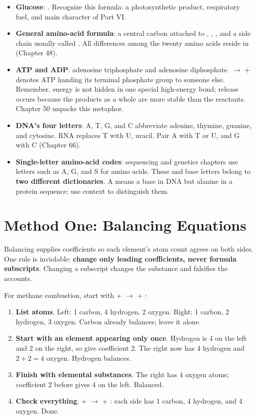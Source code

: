 \begin{itemize}[itemsep=2pt]
\item \textbf{Glucose}: . Recognize this formula: a photosynthetic product, respiratory fuel, and main character of Part VI.
\item \textbf{General amino-acid formula}: a central carbon attached to , , , and a side chain usually called . All differences among the twenty amino acids reside in  (Chapter 48).
\item \textbf{ATP and ADP}: adenosine triphosphate and adenosine diphosphate.  $\rightarrow$  +  denotes ATP handing its terminal phosphate group to someone else. Remember, energy is not hidden in one special high-energy bond; release occurs because the products as a whole are more stable than the reactants. Chapter 50 unpacks this metaphor.
\item \textbf{DNA's four letters}: A, T, G, and C abbreviate adenine, thymine, guanine, and cytosine. RNA replaces T with U, uracil. Pair A with T or U, and G with C (Chapter 66).
\item \textbf{Single-letter amino-acid codes}: sequencing and genetics chapters use letters such as A, G, and S for amino acids. These and base letters belong to \textbf{two different dictionaries}. A means a base in DNA but alanine in a protein sequence; use context to distinguish them.
\end{itemize}

\section{Method One: Balancing Equations}

Balancing supplies coefficients so each element's atom count agrees on both sides. One rule is inviolable: \textbf{change only leading coefficients, never formula subscripts}. Changing a subscript changes the substance and falsifies the accounts.

For methane combustion, start with  +  $\rightarrow$  + :

\begin{enumerate}[itemsep=2pt]
\item \textbf{List atoms}. Left: 1 carbon, 4 hydrogen, 2 oxygen. Right: 1 carbon, 2 hydrogen, 3 oxygen. Carbon already balances; leave it alone.
\item \textbf{Start with an element appearing only once}. Hydrogen is 4 on the left and 2 on the right, so give  coefficient 2. The right now has 4 hydrogen and $2+2=4$ oxygen. Hydrogen balances.
\item \textbf{Finish with elemental substances}. The right has 4 oxygen atoms; coefficient 2 before  gives 4 on the left. Balanced.
\item \textbf{Check everything}.  +  $\rightarrow$  + : each side has 1 carbon, 4 hydrogen, and 4 oxygen. Done.
\end{enumerate}

